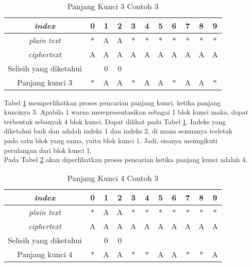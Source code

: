 	\\	
	\begin{table}[H]
	 	\centering
	 	\caption{Panjang Kunci 3 Contoh 3}
	 	\setlength{\arrayrulewidth}{.08em}
	 	\begin{tabular}{|c|c|c|c|c|c|c|c|c|c|c|}\hline
	 	\textit{index}&0&1&2&3&4&5&6&7&8&9\\ \hline
	 	\textit{plain text}&\cellcolor{blue!15}*&\cellcolor{blue!15}A&\cellcolor{blue!15}A&\cellcolor{blue!15}*&\cellcolor{green!15}*&\cellcolor{green!15}*&\cellcolor{green!15}*&\cellcolor{green!15}*&\cellcolor{violet!30}*&\cellcolor{violet!30}*\\ \hline
	 	\textit{ciphertext}&\cellcolor{blue!15}A&\cellcolor{blue!15}A&\cellcolor{blue!15}A&\cellcolor{blue!15}A&\cellcolor{green!15}A&\cellcolor{green!15}A&\cellcolor{green!15}A&\cellcolor{green!15}A&\cellcolor{violet!30}A&\cellcolor{violet!30}A\\ \hline
		Selisih yang diketahui & &0&0& & & & & & & \\ \hline	
		Panjang kunci 3 &*&A&A&*&A&A&*&A&A&*\\ \hline 	
	 	\end{tabular}
	 	\label{tab:k3contoh3}
	\end{table}
	Tabel \ref{tab:k3contoh3} memperlihatkan proses pencarian panjang kunci, ketika panjang kuncinya 3. Apabila 1 warna merepresentasikan sebagai 1 blok kunci maka, dapat terbentuk sebanyak 4 blok kunci. Dapat dilihat pada Tabel \ref{tab:k3contoh3}. Indeks yang diketahui baik \plaintext dan \ciphertext adalah indeks 1 dan indeks 2, di mana semuanya terletak pada satu blok yang sama, yaitu blok kunci 1. Jadi, sisanya menngikuti perulangan dari blok kunci 1. 
	\\
	Pada Tabel \ref{tab:k4contoh3} akan diperlihatkan proses pencarian ketika panjang kunci adalah 4.
	\begin{table}[H]
	 	\centering
	 	\caption{Panjang Kunci 4 Contoh 3}
	 	\setlength{\arrayrulewidth}{.08em}
	 	\begin{tabular}{|c|c|c|c|c|c|c|c|c|c|c|}\hline
	 	\textit{index}&0&1&2&3&4&5&6&7&8&9\\ \hline
	 	\textit{plain text}&\cellcolor{blue!15}*&\cellcolor{blue!15}A&\cellcolor{blue!15}A&\cellcolor{green!15}*&\cellcolor{green!15}*&\cellcolor{green!15}*&\cellcolor{violet!30}*&\cellcolor{violet!30}*&\cellcolor{violet!30}*&\cellcolor{purple!25}*\\ \hline
	 	\textit{ciphertext}&\cellcolor{blue!15}A&\cellcolor{blue!15}A&\cellcolor{blue!15}A&\cellcolor{green!15}A&\cellcolor{green!15}A&\cellcolor{green!15}A&\cellcolor{violet!30}A&\cellcolor{violet!30}A&\cellcolor{violet!30}A&\cellcolor{purple!25}A\\ \hline
		Selisih yang diketahui & &0&0& & & & & & & \\ \hline	
		Panjang kunci 4 &*&A&A&*&*&A&A&*&*&A\\ \hline 	
	 	\end{tabular}
	 	\label{tab:k4contoh3}
	\end{table}
